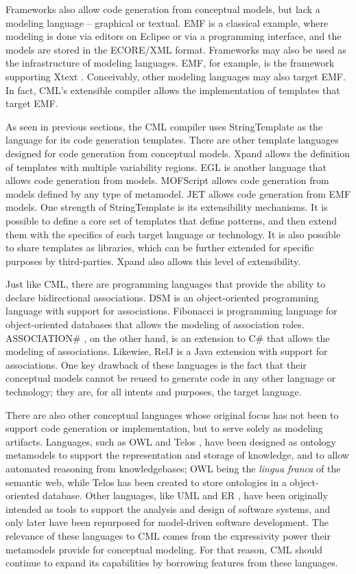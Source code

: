Frameworks also allow code generation from conceptual models,
but lack a modeling language -- graphical or textual.
EMF \cite{emf} is a classical example,
where modeling is done via editors on Eclipse or via a programming interface,
and the models are stored in the ECORE/XML format.
Frameworks may also be used as the infrastructure of modeling languages.
EMF, for example, is the framework supporting Xtext \cite{xtext}.
Conceivably, other modeling languages may also target EMF.
In fact, CML's extensible compiler allows the implementation of templates that target EMF.

As seen in previous sections,
the CML compiler uses StringTemplate \cite{st} as the language for its code generation templates.
There are other template languages designed for code generation from conceptual models.
Xpand \cite{xpand} allows the definition of templates with multiple variability regions.
EGL \cite{egl} is another language that allows code generation from models.
MOFScript \cite{mofscript} allows code generation from models defined
by any type of metamodel.
JET \cite{jet} allows code generation from EMF \cite{emf} models.
One strength of StringTemplate is its extensibility mechanisms.
It is possible to define a core set of templates that define patterns,
and then extend them with the specifics of each target language or technology.
It is also possible to share templates as libraries,
which can be further extended for specific purposes by third-parties.
Xpand also allows this level of extensibility.

Just like CML, there are programming languages
that provide the ability to declare bidirectional associations.
DSM \cite{balzer} is an object-oriented programming language with support for associations.
Fibonacci \cite{fibonacci} is programming language for object-oriented databases
that allows the modeling of association roles.
ASSOCIATION\# \cite{cardoso}, on the other hand,
is an extension to C\# that allows the modeling of associations.
Likewise, RelJ \cite{bierman} is a Java extension with support for associations.
One key drawback of these languages is the fact that their conceptual models
cannot be reused to generate code in any other language or technology;
they are, for all intents and purposes, the target language.

There are also other conceptual languages
whose original focus has not been to support code generation or implementation,
but to serve solely as modeling artifacts.
Languages, such as OWL \cite{owl2} and Telos \cite{telos},
have been designed as ontology metamodels
to support the representation and storage of knowledge,
and to allow automated reasoning from knowledgebases;
OWL being the \emph{lingua franca} of the semantic web,
while Telos has been created to store ontologies in a object-oriented database.
Other languages, like UML \cite{uml} and ER \cite{er},
have been originally intended as tools to support the analysis and design of software systems,
and only later have been repurposed for model-driven software development.
The relevance of these languages to CML comes from the expressivity power
their metamodels provide for conceptual modeling.
For that reason,
CML should continue to expand its capabilities
by borrowing features from these languages.
